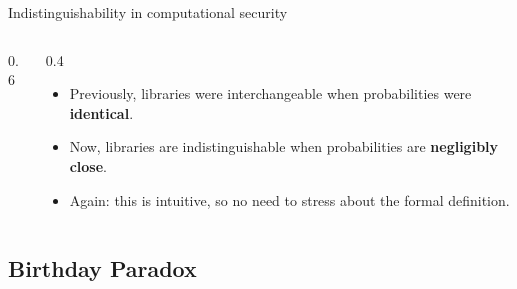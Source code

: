 \ifdefined\PRESENTATION\else\PassOptionsToClass{handout}{beamer}\fi\documentclass[aspectratio=169, lualatex]{beamer}
\begin{document}
\begin{frame}{Indistinguishability in computational security}
	\begin{columns}[c]
		\begin{column}{0.6\textwidth}
		\end{column}
		\begin{column}{0.4\textwidth}
			\begin{itemize}
				\item Previously, libraries were interchangeable when probabilities were \textbf{identical}.
				\item Now, libraries are indistinguishable when probabilities are \textbf{negligibly close}.
				\item Again: this is intuitive, so no need to stress about the formal definition.
			\end{itemize}
		\end{column}
	\end{columns}
\end{frame}

\subsection{Birthday Paradox}
\end{document}
